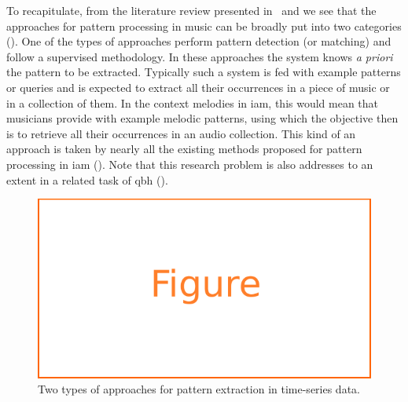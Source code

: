 
To recapitulate, from the literature review presented in~ and  we see that the approaches for pattern processing in music can be broadly put into two categories (). One of the types of approaches perform pattern detection (or matching) and follow a supervised methodology. In these approaches the system knows \textit{a priori} the pattern to be extracted. Typically such a system is fed with example patterns or queries and is expected to extract all their occurrences in a piece of music or in a collection of them. In the context melodies in \gls{iam}, this would mean that musicians provide with example melodic patterns, using which the objective then is to retrieve all their occurrences in an audio collection. This kind of an approach is taken by nearly all the existing methods proposed for pattern processing in \gls{iam} (). Note that this research problem is also addresses to an extent in a related task of \acrfull{qbh} ().

\begin{figure}
	\begin{center}
		\includegraphics[width=\figSizeSixty]{ch06_patterns/figures/figure_todo.pdf}
	\end{center}
	\caption{Two types of approaches for pattern extraction in time-series data.}
	\label{fig:types_of_methodologies_for_extraction}
\end{figure}

